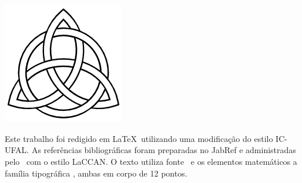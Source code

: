 \documentclass[tcc]{ic}
\begin{document}
% 

\begin{raggedright}
\renewcommand{\bibsection}{
\chapter*{\vspace{-3cm}\centering \Large \textsc{Referências Bibliográficas}}
\addcontentsline{toc}{chapter}{Referências Bibliográficas}
}

\newpage\lhead{\rightmark}
\end{raggedright}


\chapter*{}
\vfill
\singlespacing
\thispagestyle{empty}
\begin{center}
\includegraphics[width=.3\textwidth]{./capitulos/figs/knot}

\vspace{.5cm}

Este trabalho foi redigido em {\large \LaTeX}\ utilizando uma modificação do estilo \textsf{IC-UFAL}.
As referências bibliográficas foram preparadas no \textsf{JabRef} e administradas pelo {\large\BibTeX}\ com o estilo \textsf{LaCCAN}.
O texto utiliza fonte \NomeFonte\ e os elementos matemáticos a família tipográfica \NomeFonteMat, ambas em corpo de 12 pontos.
\vspace{.5cm}
\end{center}
\end{document}

